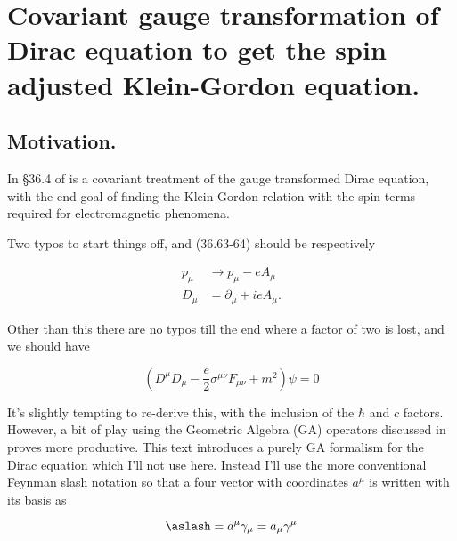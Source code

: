 
%

\chapter{Covariant gauge transformation of Dirac equation to get the spin adjusted Klein-Gordon equation.}
\label{chap:diracCovariant}
{}
\date{Sept 1, 2011}

\beginArtWithToc

\section{Motivation.}

In \S 36.4 of \cite{desai2009quantum} is a covariant treatment of the gauge transformed Dirac equation, with the end goal of finding the Klein-Gordon relation with the spin terms required for electromagnetic phenomena.

Two typos to start things off, and (36.63-64) should be respectively

\begin{align}\label{eqn:diracCovariant:10}
p_\mu &\rightarrow p_\mu - e A_\mu \\
D_\mu &= \partial_\mu + i e A_\mu.
\end{align}

Other than this there are no typos till the end where a factor of two is lost, and we should have

\begin{equation}\label{eqn:diracCovariant:30}
\left( D^\mu D_\mu - \frac{e}{2} \sigma^{\mu \nu} F_{\mu \nu} + m^2 \right) \psi = 0
\end{equation}

It's slightly tempting to re-derive this, with the inclusion of the $\hbar$ and $c$ factors.  However, a bit of play using the Geometric Algebra (GA) operators discussed in \cite{doran2003gap} proves more productive.  This text introduces a purely GA formalism for the Dirac equation which I'll not use here.  Instead I'll use the more conventional Feynman slash notation so that a four vector with coordinates $a^\mu$ is written with its basis as

\begin{equation}\label{eqn:diracCovariant:50}
\aslash = a^\mu \gamma_\mu = a_\mu \gamma^\mu
\end{equation}

